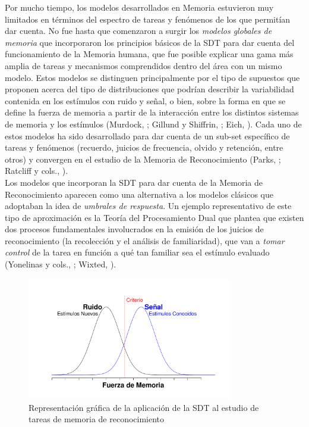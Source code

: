 Por mucho tiempo, los modelos desarrollados en Memoria estuvieron muy limitados en términos del espectro de tareas y fenómenos de los que permitían dar cuenta. No fue hasta que comenzaron a surgir los \textit{modelos globales de memoria} que incorporaron los principios básicos de la SDT para dar cuenta del funcionamiento de la Memoria humana, que fue posible explicar una gama más amplia de tareas y mecanismos comprendidos dentro del área con un mismo modelo. Estos modelos se distinguen principalmente por el tipo de supuestos que proponen acerca del tipo de distribuciones que podrían describir la variabilidad contenida en los estímulos con ruido y señal, o bien, sobre la forma en que se define la fuerza de memoria a partir de la interacción entre los distintos sistemas de memoria y los estímulos (Murdock, \citeyear{Murdock1982}; Gillund y Shiffrin, \citeyear{Gillund1984}; Eich, \citeyear{Eich1985}). Cada uno de estos modelos ha sido desarrollado para dar cuenta de un sub-set específico de tareas y fenómenos (recuerdo, juicios de frecuencia, olvido y retención, entre otros) y convergen en el estudio de la Memoria de Reconocimiento (Parks, \citeyear{Parks1966}; Ratcliff y cols., \citeyear{Ratcliff1992}).\\

Los modelos que incorporan la SDT para dar cuenta de la Memoria de Reconocimiento aparecen como una alternativa a los modelos clásicos que adoptaban la idea de \textit{umbrales de respuesta}. Un ejemplo representativo de este tipo de aproximación es la Teoría del Procesamiento Dual que plantea que existen dos procesos fundamentales involucrados en la emisión de los juicios de reconocimiento (la recolección y el análisis de familiaridad), que van a \textit{tomar control} de la tarea en función a qué tan familiar sea el estímulo evaluado (Yonelinas y cols., \citeyear{Yonelinas1996}; Wixted, \citeyear{Wixted2007}).\\

\begin{figure}[h]
\centering
\includegraphics[width=0.8\textwidth]{Figures/RM_SDT_1} 
\caption[SDT aplicada a tareas de memoria de reconocimiento]{Representación gráfica de la aplicación de la SDT al estudio de tareas de memoria de reconocimiento}
\label{fig:RM_SDT_1}
\end{figure}

